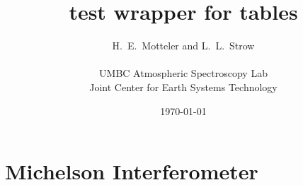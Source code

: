 \documentclass[6pt]{article}
\title{test wrapper for tables}
\author{H.~E.~Motteler and L.~L.~Strow \\
  \\
  UMBC Atmospheric Spectroscopy Lab \\
  Joint Center for Earth Systems Technology \\
}
\date{\today}
\begin{document}
\maketitle

\section{Michelson Interferometer}


\end{document}
